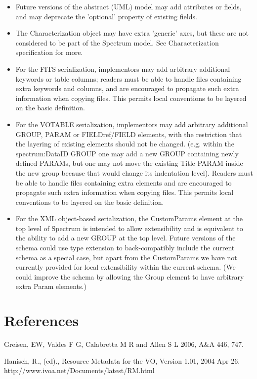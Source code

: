 \documentclass[11pt]{article}
\begin{document}
\begin{itemize}
\item Future versions of the abstract (UML) model may add attributes
or fields, and may deprecate the 'optional' property of existing fields.
\item The Characterization object may have extra 'generic' axes, but
these are not considered to be part of the Spectrum model. See Characterization
specification for more.
\item For the FITS serialization, implementors may add arbitrary additional keywords
or table columns; readers must be able to handle files containing extra
keywords and columns, and are encouraged to propagate such extra information
when copying files. This permits local conventions to be layered on the
basic definition.
\item For the VOTABLE serialization, implementors may add arbitrary additional 
GROUP, PARAM or FIELDref/FIELD elements, with the restriction that
the layering of existing elements should not be changed. (e.g.
within the spectrum:DataID GROUP one may add a new GROUP containing
newly defined PARAMs, but one may not move the existing Title PARAM inside the
new group because that would change its indentation level).
Readers must be able to handle files containing extra elements
and are encouraged to propagate such extra information
when copying files. This permits local conventions to be layered on the
basic definition.
\item For the XML object-based serialization, 
the CustomParams element at the top level of Spectrum is intended
to allow extensibility and is equivalent to the ability to add a new
GROUP at the top level. Future versions of the schema could use
type extension to back-compatibly include the current schema as a special case, but
apart from the CustomParams we have not currently provided for
local extensibility within the current schema. (We could improve the
schema by allowing the Group element to have arbitrary extra Param elements.)

\end{itemize}

\section*{References}

Greisen, EW, Valdes F G, Calabretta M R and Allen S L 2006,
A\&A 446, 747.\\
\vskip 0.1in
\par\noindent
Hanisch, R., (ed)., Resource Metadata for the VO, Version 1.01,
2004 Apr 26.  \\
http://www.ivoa.net/Documents/latest/RM.html
\end{document}
